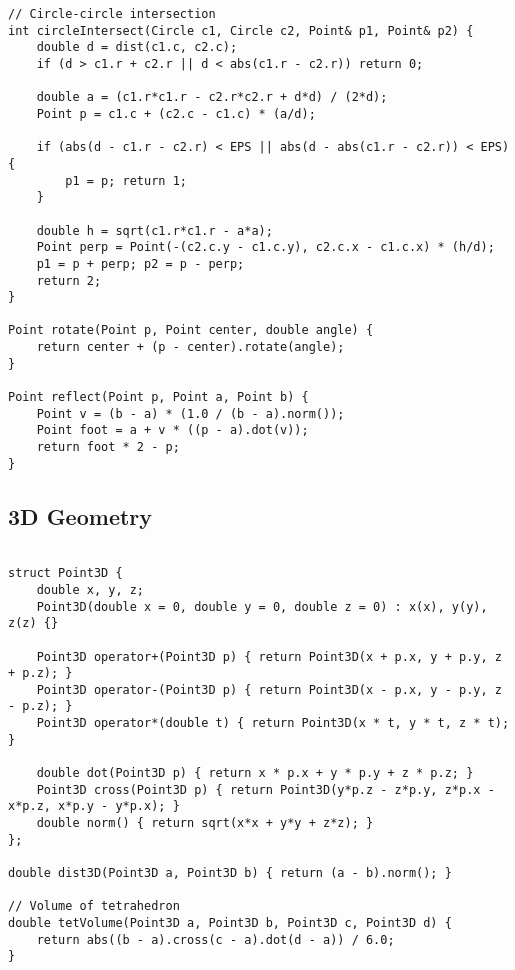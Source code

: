 \documentclass[11pt,a4paper]{article}
\begin{document}
\newpage

\begin{lstlisting}[caption={Circle Intersection and Transformations}]
// Circle-circle intersection
int circleIntersect(Circle c1, Circle c2, Point& p1, Point& p2) {
    double d = dist(c1.c, c2.c);
    if (d > c1.r + c2.r || d < abs(c1.r - c2.r)) return 0;
    
    double a = (c1.r*c1.r - c2.r*c2.r + d*d) / (2*d);
    Point p = c1.c + (c2.c - c1.c) * (a/d);
    
    if (abs(d - c1.r - c2.r) < EPS || abs(d - abs(c1.r - c2.r)) < EPS) {
        p1 = p; return 1;
    }
    
    double h = sqrt(c1.r*c1.r - a*a);
    Point perp = Point(-(c2.c.y - c1.c.y), c2.c.x - c1.c.x) * (h/d);
    p1 = p + perp; p2 = p - perp;
    return 2;
}

Point rotate(Point p, Point center, double angle) {
    return center + (p - center).rotate(angle);
}

Point reflect(Point p, Point a, Point b) {
    Point v = (b - a) * (1.0 / (b - a).norm());
    Point foot = a + v * ((p - a).dot(v));
    return foot * 2 - p;
}
\end{lstlisting}

\newpage

\subsection{3D Geometry}
\begin{lstlisting}[caption={3D Point and Vector Operations}]

struct Point3D {
    double x, y, z;
    Point3D(double x = 0, double y = 0, double z = 0) : x(x), y(y), z(z) {}
    
    Point3D operator+(Point3D p) { return Point3D(x + p.x, y + p.y, z + p.z); }
    Point3D operator-(Point3D p) { return Point3D(x - p.x, y - p.y, z - p.z); }
    Point3D operator*(double t) { return Point3D(x * t, y * t, z * t); }
    
    double dot(Point3D p) { return x * p.x + y * p.y + z * p.z; }
    Point3D cross(Point3D p) { return Point3D(y*p.z - z*p.y, z*p.x - x*p.z, x*p.y - y*p.x); }
    double norm() { return sqrt(x*x + y*y + z*z); }
};

double dist3D(Point3D a, Point3D b) { return (a - b).norm(); }

// Volume of tetrahedron
double tetVolume(Point3D a, Point3D b, Point3D c, Point3D d) {
    return abs((b - a).cross(c - a).dot(d - a)) / 6.0;
}
\end{lstlisting}
\end{document}

